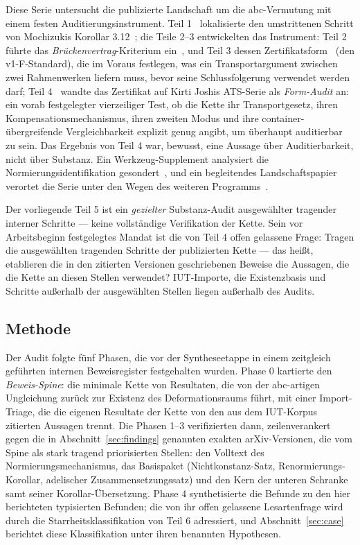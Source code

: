 \documentclass[11pt,a4paper]{article}
\theoremstyle{definition}
\theoremstyle{remark}
\begin{document}
Diese Serie untersucht die publizierte Landschaft um die abc-Vermutung mit
einem festen Auditierungsinstrument. Teil 1~\cite{part1} lokalisierte den
umstrittenen Schritt von Mochizukis Korollar
3.12~\cite{mochizukiIUT,scholzestix}; die Teile 2--3 entwickelten das
Instrument: Teil 2 führte das \emph{Brückenvertrag}-Kriterium
ein~\cite{part2}, und Teil 3 dessen Zertifikatsform~\cite{part3} (den
v1-F-Standard), die im Voraus festlegen, was ein Transportargument zwischen
zwei Rahmenwerken liefern muss, bevor seine Schlussfolgerung verwendet werden
darf; Teil 4~\cite{part4} wandte das Zertifikat auf Kirti Joshis
ATS-Serie als \emph{Form-Audit} an: ein vorab festgelegter vierzeiliger
Test, ob die Kette ihr Transportgesetz, ihren Kompensationsmechanismus,
ihren zweiten Modus und ihre container-übergreifende Vergleichbarkeit
explizit genug angibt, um überhaupt auditierbar zu sein. Das Ergebnis von
Teil 4 war, bewusst, eine Aussage über Auditierbarkeit, nicht über Substanz.
Ein Werkzeug-Supplement analysiert die Normierungsidentifikation
gesondert~\cite{gnc}, und ein begleitendes Landschaftspapier verortet die
Serie unter den Wegen des weiteren Programms~\cite{landscapeA}.

Der vorliegende Teil 5 ist ein \emph{gezielter} Substanz-Audit ausgewählter
tragender interner Schritte --- keine vollständige Verifikation der Kette.
Sein vor Arbeitsbeginn festgelegtes Mandat ist die von Teil 4 offen
gelassene Frage: Tragen die ausgewählten tragenden Schritte der publizierten
Kette --- das heißt, etablieren die in den zitierten Versionen
geschriebenen Beweise die Aussagen, die die Kette an diesen Stellen
verwendet? IUT-Importe, die Existenzbasis und Schritte außerhalb der
ausgewählten Stellen liegen außerhalb des Audits.

\subsection{Methode}

Der Audit folgte fünf Phasen, die vor der Syntheseetappe in einem
zeitgleich geführten internen Beweisregister festgehalten wurden. Phase 0
kartierte den \emph{Beweis-Spine}: die minimale Kette von Resultaten, die
von der abc-artigen Ungleichung zurück zur Existenz des Deformationsraums
führt, mit einer Import-Triage, die die eigenen Resultate der Kette von den
aus dem IUT-Korpus zitierten Aussagen trennt. Die Phasen 1--3 verifizierten
dann, zeilenverankert gegen die in Abschnitt~\ref{sec:findings} genannten
exakten arXiv-Versionen, die vom Spine als stark tragend priorisierten
Stellen: den Volltext des Normierungsmechanismus, das Basispaket
(Nichtkonstanz-Satz, Renormierungs-Korollar, adelischer
Zusammensetzungssatz) und den Kern der unteren Schranke samt seiner
Korollar-Übersetzung. Phase 4 synthetisierte die Befunde zu den hier
berichteten typisierten Befunden; die von ihr offen gelassene Lesartenfrage
wird durch die Starrheitsklassifikation von Teil 6 adressiert, und
Abschnitt~\ref{sec:case} berichtet diese Klassifikation unter ihren
benannten Hypothesen.
\end{document}
